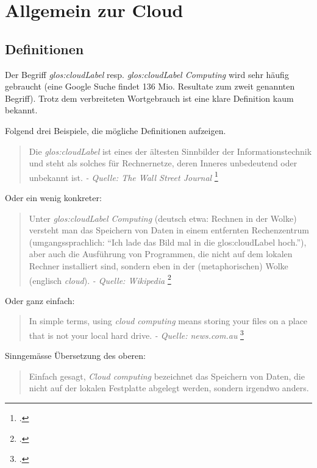 \chapter{Allgemein zur Cloud}

\section{Definitionen}
\label{sec:cloud:definition}

Der Begriff \textit{\Gls{glos:cloudLabel}} resp. \textit{\Gls{glos:cloudLabel} Computing} wird sehr häufig gebraucht (eine Google Suche findet 136 Mio. Resultate zum zweit genannten Begriff).
Trotz dem verbreiteten Wortgebrauch ist eine klare Definition kaum bekannt.

Folgend drei Beispiele, die mögliche Definitionen aufzeigen.

\begin{quote}
	Die \textit{glos:cloudLabel} ist eines der ältesten Sinnbilder der Informationstechnik und steht als solches für Rechnernetze, deren Inneres unbedeutend oder unbekannt ist. \textit{- Quelle: The Wall Street Journal}  \footcite{The_Internet_Industry_Is_on_a_Cloud_--_Whatever_That_May_Mean_-_WSJ_2014-10-03}
\end{quote}

Oder ein wenig konkreter:

\begin{quote}
	Unter \textit{glos:cloudLabel Computing} (deutsch etwa: Rechnen in der Wolke) versteht man das Speichern von Daten in einem entfernten Rechenzentrum (umgangssprachlich: "`Ich lade das Bild mal in die \Gls{glos:cloudLabel} hoch."'), aber auch die Ausführung von Programmen, die nicht auf dem lokalen Rechner installiert sind, sondern eben in der (metaphorischen) Wolke (englisch \textit{cloud}). \textit{- Quelle: Wikipedia} \footcite{Cloud_Computing__Wikipedia_2014-10-03}
\end{quote}

Oder ganz einfach:

\begin{quote}
	In simple terms, using \textit{cloud computing} means storing your files on a place that is not your local hard drive.  \textit{- Quelle: news.com.au} \footcite{What_really_is_The_Cloud?_And_how_does_it_work?_A_simple_explainer_2014-10-31}
\end{quote}

Sinngemässe Übersetzung des oberen:
\begin{quote}
	Einfach gesagt, \textit{Cloud computing} bezeichnet das Speichern von Daten, die nicht auf der lokalen Festplatte abgelegt werden, sondern irgendwo anders.
\end{quote}

